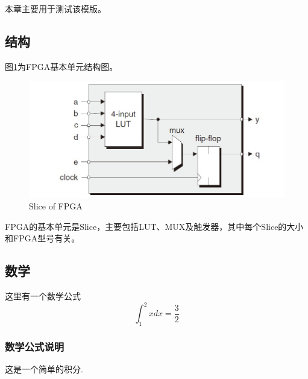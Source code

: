 本章主要用于测试该模版。

\subsection{结构}
图\ref{f1}为FPGA基本单元结构图。
\begin{figure}[H] %
    \centering
    \includegraphics{img/FPGA.jpg}
    \caption{Slice of FPGA} %
    \label{f1} %
\end{figure}

FPGA的基本单元是Slice，主要包括LUT、MUX及触发器，其中每个Slice的大小和FPGA型号有关。

\subsection{数学}
这里有一个数学公式
\begin{equation}
    \int_1^2 x dx = \frac{3}{2} 
\end{equation}

\subsubsection{数学公式说明}
这是一个简单的积分.

